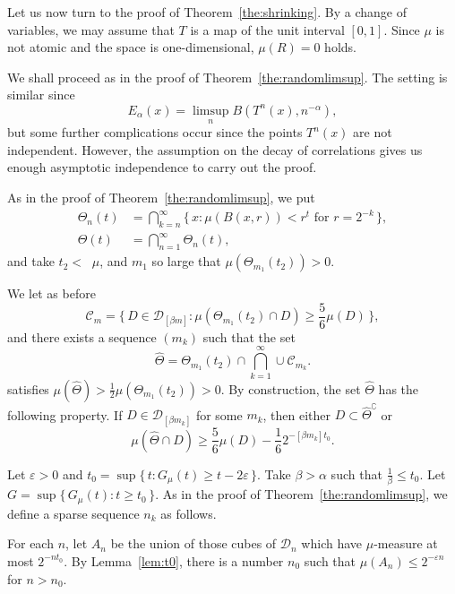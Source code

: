 \documentclass[AHL,Unicode,longabstracts]{cedram}
\DeclareMathOperator{\udimh}{\overline{dim}_H}
\begin{document}
Let us now turn to the proof of Theorem~\ref{the:shrinking}. By a change of variables, we may assume that $T$ is a map of the unit interval $[0,1]$. Since $\mu$ is not atomic and the space is one-dimensional, $\mu (R) = 0$ holds.

We shall proceed as in the proof of Theorem~\ref{the:randomlimsup}. The setting is similar since
\[
E_\alpha (x) = \limsup_n B(T^n (x), n^{-\alpha}),
\]
but some further complications occur since the points $T^n (x)$ are not independent. However, the assumption on the decay of correlations gives us enough asymptotic independence to carry out the proof.

As in the proof of Theorem~\ref{the:randomlimsup}, we put
\begin{align*}
\Theta_n (t) &= \bigcap_{k=n}^\infty \{\, x : \mu (B(x,r)) < r^t
\text{ for } r = 2^{- k} \,\}, \\ \Theta (t) &= \bigcap_{n=1}^\infty
\Theta_n (t),
\end{align*}
and take $t_2 < \udimh \mu$, and $m_1$ so large that $\mu (\Theta_{m_1} (t_2)) > 0$.

We let as before
\[
\mathscr{C}_m = \{\, D \in \mathscr{D}_{[\beta m]} : \mu (\Theta_{m_1} (t_2) \cap D) \geq \frac{5}{6} \mu (D) \,\},
\]
and there exists a sequence $(m_k)$ such that the set
\[
\hat{\Theta} = \Theta_{m_1} (t_2) \cap \bigcap_{k=1}^\infty \cup
\mathscr{C}_{m_k}.
\]
satisfies $\mu (\hat{\Theta}) > \frac{1}{2} \mu (\Theta_{m_1} (t_2)) > 0$. By construction, the set $\hat{\Theta}$ has the following property. If $D \in \mathscr{D}_{[\beta m_k]}$ for some $m_k$, then either $D \subset \hat{\Theta}^\complement$ or
\begin{equation}\label{eq:propertyofDelta2}
\mu (\hat{\Theta} \cap D) \geq \frac{5}{6} \mu (D) - \frac{1}{6} 2^{-[\beta m_k]t_0}.
\end{equation}

Let $\varepsilon > 0$ and $t_0 = \sup \{\, t: G_\mu (t) \geq t - 2
\varepsilon \,\}$. Take $\beta > \alpha$ such that $\frac{1}{\beta}
\leq t_0$. Let $G = \sup \{\, G_\mu (t) : t \geq t_0 \,\}$. As in the proof of Theorem~\ref{the:randomlimsup}, we define a sparse sequence $n_k$ as follows.

For each $n$, let $A_n$ be the union of those cubes of $\mathscr{D}_n$ which have $\mu$-measure at most $2^{-n t_0}$. By Lemma~\ref{lem:t0}, there is a number $n_0$ such that $\mu (A_n) \leq 2^{-\varepsilon n}$ for $n > n_0$.
\end{document}
